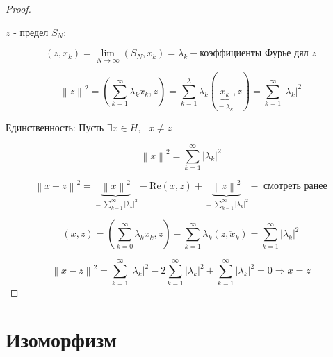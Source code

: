 \documentclass[12pt, a4paper]{report}
\begin{document}
\begin{proof}
    \[  \] 

    \( z  \)  - предел \( S_N \): 

    \[ (z , x_k ) =\lim_{N  \to \infty} (S_N , x_k )  = \lambda_k - \text{коэффициенты Фурье дял } z \] 

    \[ \left\lVert z  \right\rVert   ^2 = \left(  \sum_{k =1}^{ \infty  } \lambda_k x_k , z       \right) = \sum_{k =1}^{\lambda } \lambda_k ( \underbrace{x_k}_{=\overline{\lambda_k}  }, z ) = \sum_{k =1} ^{ \infty  } \left\lvert \lambda_k \right\rvert ^2    \] 

    Единственность: Пусть \( \exists  x \in  H , \text{ }  x \neq z  \) 

    \[ \left\lVert x   \right\rVert ^2 = \sum_{k =1}^{ \infty  } \left\lvert \lambda_k       \right\rvert ^2   \] 

    \[ \left\lVert  x - z  \right\rVert ^2 =\underbrace{ \left\lVert x \right\rVert  ^2}_{=\sum_{k =1}^{\infty  }\left\lvert \lambda_k   \right\rvert ^2  } - \mathrm{Re } (x,z )  + \underbrace{ \left\lVert z \right\rVert  ^2}_{=\sum_{k =1}^{\infty  }\left\lvert \lambda_k   \right\rvert ^2  } - \text{ смотреть ранее} \] 

    \[ (x, z ) =\left(  \sum_{k =0 }^{ \infty  } \lambda_k x_k , z   \right) - \sum _{k =1} ^{ \infty  } \lambda_k (\overline{z, x_k}  ) = \sum_{k =1}^{ \infty } \left\lvert \lambda_k      \right\rvert ^2  \]  

    \[ \left\lVert x -z  \right\rVert ^2 = \sum _{k =1}^{ \infty  } \left\lvert \lambda_k \right\rvert ^2 - 2 \sum  _{k =1}^{ \infty  } \left\lvert \lambda_k    \right\rvert ^2 + \sum _{k =1} ^{ \infty  } \left\lvert \lambda_k \right\rvert ^2 = 0 \Rightarrow x = z\] 
\end{proof}

\section{Изоморфизм}
\end{document}
